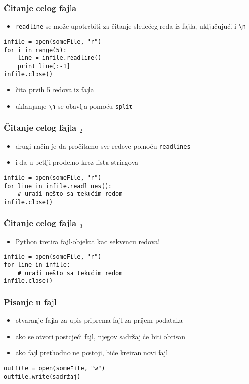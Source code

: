 \documentclass[utf8,compress,aspectratio=169]{beamer}
\begin{document}
\begin{frame}[fragile]
  \frametitle{Čitanje celog fajla}
  \begin{itemize}
    \item \texttt{readline} se može upotrebiti za čitanje sledećeg reda iz fajla, uključujući i \texttt{\textbackslash n}
  \end{itemize}
\begin{verbatim}
infile = open(someFile, "r")
for i in range(5):
    line = infile.readline()
    print line[:-1]
infile.close()
\end{verbatim}
  \begin{itemize}
    \item čita prvih 5 redova iz fajla
    \item uklanjanje \texttt{\textbackslash n} se obavlja pomoću \texttt{split}
  \end{itemize}
\end{frame}

\begin{frame}[fragile]
  \frametitle{Čitanje celog fajla $_2$}
  \begin{itemize}
    \item drugi način je da pročitamo sve redove pomoću \texttt{readlines}
    \item i da u petlji prođemo kroz listu stringova
  \end{itemize}
\begin{verbatim}
infile = open(someFile, "r")
for line in infile.readlines():
    # uradi nešto sa tekućim redom
infile.close()
\end{verbatim}
\end{frame}


\begin{frame}[fragile]
  \frametitle{Čitanje celog fajla $_3$}
  \begin{itemize}
    \item Python tretira fajl-objekat kao sekvencu redova!
  \end{itemize}
\begin{verbatim}
infile = open(someFile, "r")
for line in infile:
    # uradi nešto sa tekućim redom
infile.close()
\end{verbatim}
\end{frame}

\begin{frame}[fragile]
  \frametitle{Pisanje u fajl}
  \begin{itemize}
    \item otvaranje fajla za upis priprema fajl za prijem podataka
    \item ako se otvori postojeći fajl, njegov sadržaj će biti obrisan
    \item ako fajl prethodno ne postoji, biće kreiran novi fajl
  \end{itemize}
\begin{verbatim}
outfile = open(someFile, "w")
outfile.write(sadržaj)
\end{verbatim}
\end{frame}
\end{document}
